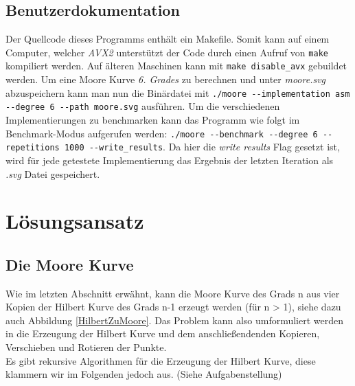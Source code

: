\documentclass[course=erap]{aspdoc}
\begin{document}
\subsection{Benutzerdokumentation}
Der Quellcode dieses Programms enthält ein Makefile. Somit kann auf einem Computer, welcher \textit{AVX2} unterstützt der Code durch einen Aufruf von \texttt{make} kompiliert werden. Auf älteren Maschinen kann mit \texttt{make disable\_avx} gebuildet werden.
\newline
Um eine Moore Kurve \textit{6. Grades} zu berechnen und unter \textit{moore.svg} abzuspeichern kann man nun die Binärdatei mit \texttt{./moore -{}-implementation asm -{}-degree 6 -{}-path moore.svg} ausführen. 
Um die verschiedenen Implementierungen zu benchmarken kann das Programm wie folgt im Benchmark-Modus aufgerufen werden: \texttt{./moore -{}-benchmark -{}-degree 6 -{}-repetitions 1000 -{}-write\_results}. Da hier die \textit{write results} Flag gesetzt ist, wird für jede getestete Implementierung das Ergebnis der letzten Iteration als \textit{.svg} Datei gespeichert. 

\section{Lösungsansatz}

\subsection{Die Moore Kurve}

Wie im letzten Abschnitt erwähnt, kann die Moore Kurve des Grads n aus vier Kopien der Hilbert Kurve des Grads n-1 erzeugt werden (für n > 1), siehe dazu auch Abbildung \ref{HilbertZuMoore}.
Das Problem kann also umformuliert werden in die Erzeugung der Hilbert Kurve und dem anschließendenden Kopieren, Verschieben und Rotieren der Punkte. 
\\
Es gibt rekursive Algorithmen für die Erzeugung der Hilbert Kurve, diese klammern wir im Folgenden jedoch aus. (Siehe Aufgabenstellung)
\FloatBarrier
\end{document}
